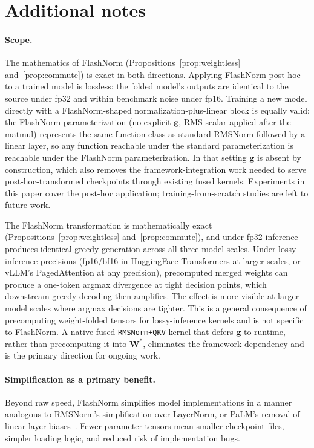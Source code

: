\documentclass{article}
\begin{document}
\section{Additional notes}\label{app:additional-notes}

\paragraph{Scope.} The mathematics of FlashNorm (Propositions~\ref{prop:weightless} and~\ref{prop:commute}) is exact in both directions. Applying FlashNorm post-hoc to a trained model is lossless: the folded model's outputs are identical to the source under fp32 and within benchmark noise under fp16. Training a new model directly with a FlashNorm-shaped normalization-plus-linear block is equally valid: the FlashNorm parameterization (no explicit $\mathbf{g}$, RMS scalar applied after the matmul) represents the same function class as standard RMSNorm followed by a linear layer, so any function reachable under the standard parameterization is reachable under the FlashNorm parameterization. In that setting $\mathbf{g}$ is absent by construction, which also removes the framework-integration work needed to serve post-hoc-transformed checkpoints through existing fused kernels. Experiments in this paper cover the post-hoc application; training-from-scratch studies are left to future work.

The FlashNorm transformation is mathematically exact (Propositions~\ref{prop:weightless} and~\ref{prop:commute}), and under fp32 inference produces identical greedy generation across all three model scales. Under lossy inference precisions (fp16/bf16 in HuggingFace Transformers at larger scales, or vLLM's PagedAttention at any precision), precomputed merged weights can produce a one-token argmax divergence at tight decision points, which downstream greedy decoding then amplifies. The effect is more visible at larger model scales where argmax decisions are tighter. This is a general consequence of precomputing weight-folded tensors for lossy-inference kernels and is not specific to FlashNorm. A native fused \texttt{RMSNorm+QKV} kernel that defers $\mathbf{g}$ to runtime, rather than precomputing it into $\mathbf{W^\ast}$, eliminates the framework dependency and is the primary direction for ongoing work.

\paragraph{Simplification as a primary benefit.}
Beyond raw speed, FlashNorm simplifies model implementations in a manner analogous
to RMSNorm's simplification over LayerNorm, or PaLM's removal of linear-layer
biases~\citep{PaLM}. Fewer parameter tensors mean smaller checkpoint
files, simpler loading logic, and reduced risk of implementation bugs.
\end{document}
